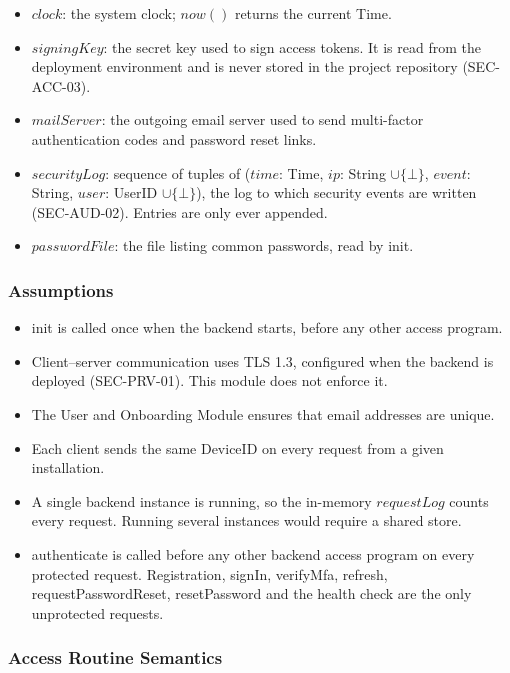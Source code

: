 \documentclass[12pt, titlepage]{article}
\begin{document}
\begin{itemize}
\item $\mathit{clock}$: the system clock; $\mathit{now}()$ returns the
  current Time.
\item $\mathit{signingKey}$: the secret key used to sign access tokens. It is
  read from the deployment environment and is never stored in the project
  repository (SEC-ACC-03).
\item $\mathit{mailServer}$: the outgoing email server used to send
  multi-factor authentication codes and password reset links.
\item $\mathit{securityLog}$: sequence of tuples of ($\mathit{time}$: Time,
  $\mathit{ip}$: String $\cup \{\bot\}$, $\mathit{event}$: String,
  $\mathit{user}$: UserID $\cup \{\bot\}$), the log to which security events
  are written (SEC-AUD-02). Entries are only ever appended.
\item $\mathit{passwordFile}$: the file listing common passwords, read by
  init.
\end{itemize}

\subsubsection{Assumptions}

\begin{itemize}
\item init is called once when the backend starts, before any other access
  program.
\item Client--server communication uses TLS 1.3, configured when the backend
  is deployed (SEC-PRV-01). This module does not enforce it.
\item The User and Onboarding Module ensures that email addresses are unique.
\item Each client sends the same DeviceID on every request from a given
  installation.
\item A single backend instance is running, so the in-memory
  $\mathit{requestLog}$ counts every request. Running several instances would
  require a shared store.
\item authenticate is called before any other backend access program on every
  protected request. Registration, signIn, verifyMfa, refresh,
  requestPasswordReset, resetPassword and the health check are the only
  unprotected requests.
\end{itemize}

\subsubsection{Access Routine Semantics}
\end{document}
